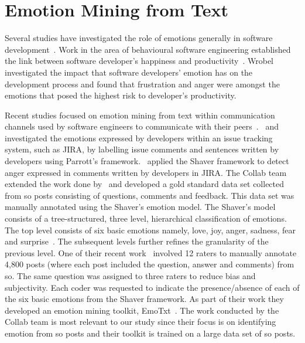  
\section{Emotion Mining from Text}\label{semotion2020:sec:EM}

Several studies have investigated the role of emotions generally in software development~\citep{wrobel2013, Shaw:2003aa, ortu2016, gachechiladze2017}. Work in the area of behavioural software engineering established the link between software developer's happiness and productivity~\citep{Graziontin:2017}. Wrobel~\citep{wrobel2013} investigated the impact that software developers' emotion has on the development process and found that frustration and anger were amongst the emotions that posed the highest risk to developer's productivity.    

Recent studies focused on emotion mining from text within communication channels used by software engineers to communicate with their peers~\citep{murgia2014, ortu2016, gachechiladze2017, novielli2018}.~\citet{murgia2014} and~\citet{ortu2016} investigated the emotions expressed by developers within an issue tracking system, such as JIRA, by labelling issue comments and sentences written by developers using Parrott's framework.~\citet{gachechiladze2017} applied the Shaver framework to detect anger expressed in comments written by developers in JIRA. The Collab team~\citep{calefato2017, novielli2018} extended the work done by~\citet{ortu2016} and developed a gold standard data set collected from \gls{so} posts consisting of questions, comments and feedback. This data set was manually annotated using the Shaver's emotion model. The Shaver's model consists of a tree-structured, three level, hierarchical classification of emotions. The top level consists of six basic emotions namely, love, joy, anger, sadness, fear and surprise~\citep{shaver1987}. The subsequent levels further refines the granularity of the previous level. One of their recent work~\citep{novielli2018} involved 12 raters to manually annotate 4,800 posts (where each post included the question, answer and comments) from \gls{so}. The same question was assigned to three raters to reduce bias and subjectivity. Each coder was requested to indicate the presence/absence of each of the six basic emotions from the Shaver framework. As part of their work they developed an emotion mining toolkit, EmoTxt~\citep{calefato2017}. The work conducted by the Collab team is most relevant to our study since their focus is on identifying emotion from \gls{so} posts and their toolkit is trained on a large data set of \gls{so} posts.



